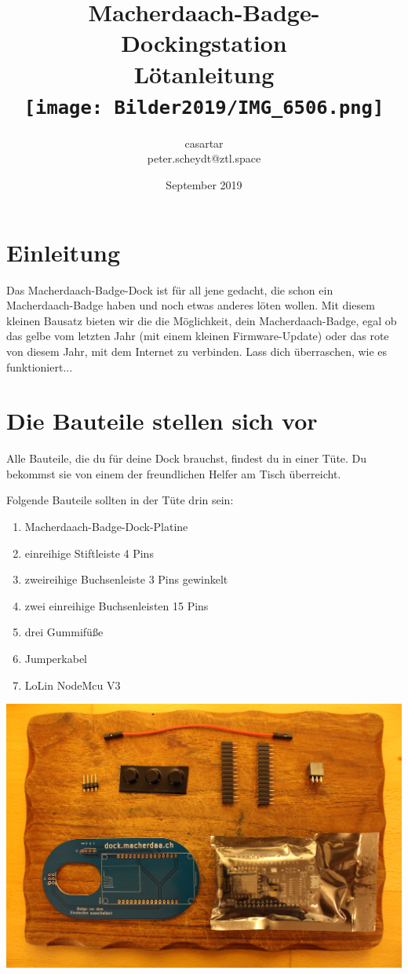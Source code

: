 \documentclass{article}
\title{Macherdaach-Badge-Dockingstation \\ Lötanleitung \\ [1cm]
\texttt{[image: Bilder2019/IMG\_6506.png]}
}
\date{September 2019}
\author{casartar\\peter.scheydt@ztl.space}
\begin{document}
\maketitle
\newpage
\section{Einleitung}

Das Macherdaach-Badge-Dock ist für all jene gedacht, die schon ein Macherdaach-Badge haben und noch etwas anderes löten wollen. Mit diesem kleinen Bausatz bieten wir die die Möglichkeit, dein Macherdaach-Badge, egal ob das gelbe vom letzten Jahr (mit einem kleinen Firmware-Update) oder das rote von diesem Jahr, mit dem Internet zu verbinden. Lass dich überraschen, wie es funktioniert...

\section{Die Bauteile stellen sich vor}
Alle Bauteile, die du für deine Dock brauchst, findest du in einer Tüte. Du bekommst sie von einem der freundlichen Helfer am Tisch überreicht.

Folgende Bauteile sollten in der Tüte drin sein:

\begin{enumerate}
	\item Macherdaach-Badge-Dock-Platine
	\item einreihige Stiftleiste 4 Pins
	\item zweireihige Buchsenleiste 3 Pins gewinkelt
	\item zwei einreihige Buchsenleisten 15 Pins
	\item drei Gummifüße
	\item Jumperkabel
	\item LoLin NodeMcu V3
\end{enumerate}



\begin{center}
\includegraphics[width=\textwidth]{Bilder2019/IMG_6462.JPG}
\label{fig:all_components}
\end{center}
\end{document}
